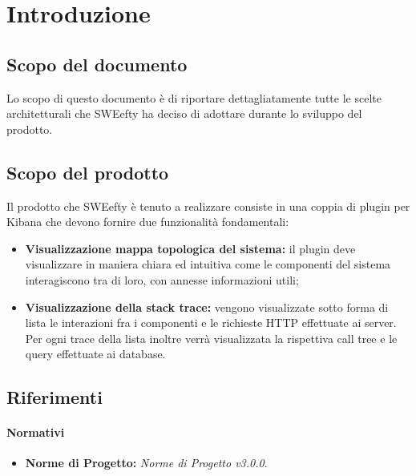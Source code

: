 \section{Introduzione}
\label{sec:intro}
	\subsection{Scopo del documento}
	Lo scopo di questo documento è di riportare dettagliatamente tutte le scelte architetturali che SWEefty ha deciso di adottare durante lo sviluppo del prodotto.
	
	\subsection{Scopo del prodotto}
	Il prodotto che SWEefty è tenuto a realizzare consiste in una coppia di plugin per Kibana che devono fornire due funzionalità fondamentali:
	\begin{itemize}
		\item \textbf{Visualizzazione mappa topologica del sistema:} il plugin deve visualizzare in maniera chiara ed intuitiva come le componenti del sistema interagiscono tra di loro, con annesse informazioni utili;
		\item \textbf{Visualizzazione della stack trace:} vengono visualizzate sotto forma di lista le interazioni fra i componenti e le richieste HTTP effettuate ai server. Per ogni trace della lista inoltre verrà visualizzata la rispettiva call tree e le query effettuate ai database.
	\end{itemize}

	\subsection{Riferimenti}
		\paragraph{Normativi}
			\begin{itemize}
				\item \textbf{Norme di Progetto:} \emph{Norme di Progetto v3.0.0}.
			\end{itemize}

